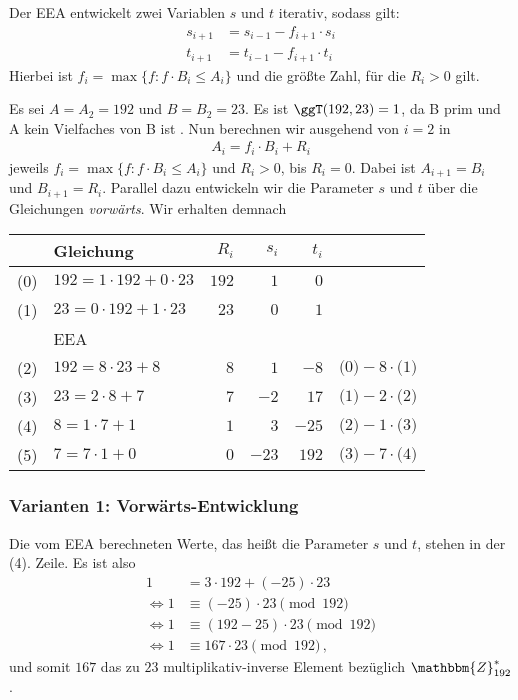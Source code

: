 Der EEA entwickelt zwei Variablen $s$ und $t$ iterativ, sodass gilt:
\begin{align*} s_{i+1} &= s_{i-1} - f_{i+1} \cdot s_{i}\\ t_{i+1} &=
                                                                    t_{i-1} - f_{i+1} \cdot t_{i}
\end{align*} Hierbei ist $f_i = \max \{f : f \cdot B_i \leq A_i\}$
und die größte Zahl, für die $R_i > 0$ gilt.
\begin{beispiel}[EEA] Es sei $A = A_2 = 192 $ und $B = B_2 = 23$. Es
  ist $\ggT(192, 23) = 1$, da B prim und A kein Vielfaches von B ist . Nun
  berechnen wir ausgehend von $i = 2$ in
  \begin{align*} A_i = f_i \cdot B_i + R_i
  \end{align*} jeweils $f_i = \max \{f : f \cdot B_i \leq A_i\}$ und
  $R_i > 0$, bis $R_i = 0$. Dabei ist $A_{i+1} = B_i$ und $B_{i+1} =
  R_i$. Parallel dazu entwickeln wir die Parameter $s$ und $t$ über die
  Gleichungen \emph{vorwärts}. Wir erhalten demnach
  \begin{table}[h] \centering \large
    \begin{tabular}[c]{|c|l|rrr|l|} \hline & Gleichung & $R_i$ & $s_i$ & $t_i$ &\\ 
      \hline 
      \hline 
      (0) & $192 = 1 \cdot 192 + 0 \cdot 23$ & $192$ & $1$ & $0$ &\\
      (1) & $23 = 0 \cdot 192 + 1 \cdot 23$ & $23$ & $0$ & $1$   &\\ 
      \hline 
          & EEA & & & &\\ 
      \hline 
      (2) & $192 = 8 \cdot 23 + 8$ & $8$ & $1$ & $-8$ & $\text{(0)} - 8 \cdot\text{(1)}$\\
      (3) & $23 = 2 \cdot 8 + 7$ & $7$ & $-2$ & $17$ & $\text{(1)} - 2  \cdot \text{(2)}$\\ 
      (4) & $8 = 1 \cdot 7 + 1$ & $1$ & $3$ & $-25$ & $\text{(2)} - 1 \cdot \text{(3)}$\\
      (5) & $7 = 7 \cdot 1 + 0$ & $0$ & $-23$ & $192$ & $\text{(3)} - 7 \cdot\text{(4)}$\\ 
      \hline
    \end{tabular}
  \end{table}
  \subsubsection*{Varianten 1: Vorwärts-Entwicklung} Die vom EEA
  berechneten Werte, das heißt die Parameter $s$ und $t$, stehen in der
  (4). Zeile. Es ist also
  \begin{align*} 1    &= 3 \cdot 192 + (-25) \cdot 23\\ 
    \Leftrightarrow 1 &\equiv (-25) \cdot 23 \pmod{192}\\ 
    \Leftrightarrow 1 &\equiv (192 - 25)\cdot 23 \pmod{192}\\
    \Leftrightarrow 1 &\equiv 167 \cdot 23 \pmod{192}\, \text{,}
  \end{align*} 
  und somit $167$ das zu $23$ multiplikativ-inverse Element bezüglich
  $\mathbbm{Z}^{\ast}_{192}$.

\end{beispiel}
